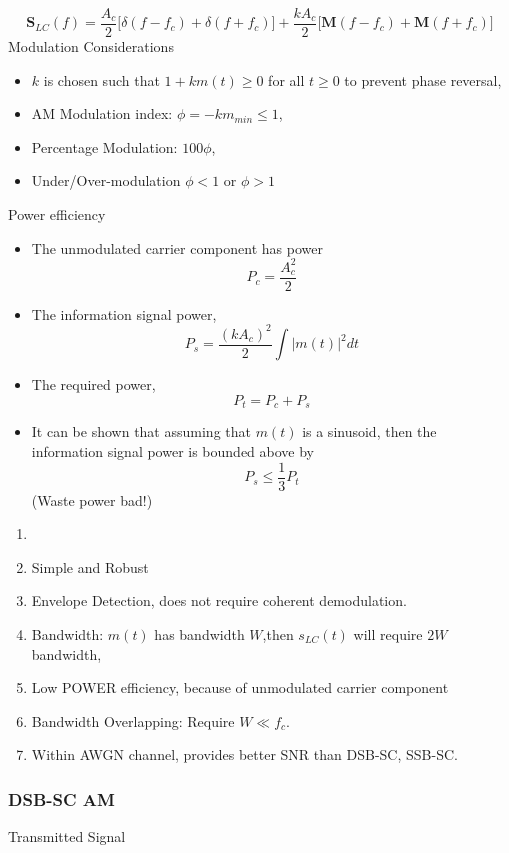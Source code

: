 \documentclass[../../main.tex]{subfiles}
\begin{document}
\begin{equation}\label{DSB-LC frequency domain}
    \mathbf{S}_{LC}(f) = \dfrac{A_c}{2}\biggl[\delta(f-f_c) + \delta(f+f_c)\biggr] + \dfrac{kA_c}{2}\biggl[\mathbf{M}(f-f_c) + \mathbf{M}(f+f_c)\biggr]
\end{equation}
Modulation Considerations
\begin{itemize}
    \item $k$ is chosen such that $1+km(t)\geq 0$ for all $t\geq 0$ to prevent phase reversal,
    \item AM Modulation index: $\phi=-km_{min}\leq 1$,
    \item Percentage Modulation: $100\phi$,
    \item Under/Over-modulation $\phi<1$ or $\phi > 1$
\end{itemize}
Power efficiency
\begin{itemize}
    \item The unmodulated carrier component has power 
    \[
    P_c = \frac{A_c^2}{2}
    \]
    \item The information signal power, 
    \[
    P_s = \dfrac{(kA_c)^2}{2}\int |m(t)|^2dt
    \]
    \item The required power, 
    \[
    P_t = P_c + P_s
    \]
    \item It can be shown that assuming that $m(t)$ is a sinusoid, then the information signal power is bounded above by 
    \[
    P_s\leq \dfrac{1}{3}P_t
    \]
    (Waste power bad!)
\end{itemize}
\begin{wtr}[DSB-LC AM]
\begin{enumerate}
    \item[]
    \item Simple and Robust
    \item Envelope Detection, does not require coherent demodulation.
    \item Bandwidth: $m(t)$ has bandwidth $W$,then $s_{LC}(t)$ will require $2W$ bandwidth,
    \item Low POWER efficiency, because of unmodulated carrier component
    \item Bandwidth Overlapping: Require $W\ll f_c$.
    \item Within AWGN channel, provides better SNR than DSB-SC, SSB-SC.
\end{enumerate}
\end{wtr}

\subsubsection{DSB-SC AM}
Transmitted Signal
\end{document}
